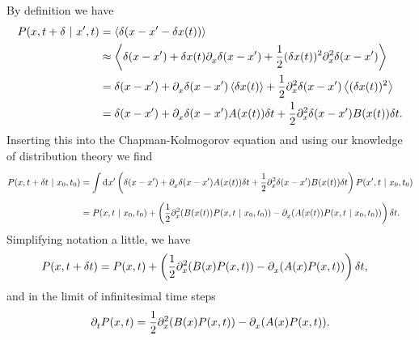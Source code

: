 By definition we have
\begin{align*}
	P(x, t + \delta \ | \  x^{\prime}, t) &= \expval{\delta(x - x\ensuremath{^{\prime}}- \delta x(t))} \\
	                              &\approx \expval{\delta(x - x\ensuremath{^{\prime}}) + \delta x(t)\partial^{}_{x}\delta(x - x\ensuremath{^{\prime}}) + \frac{1}{2}(\delta x(t))^{2}\partial^{2}_{x}\delta(x - x\ensuremath{^{\prime}})} \\
	                              &= \delta(x - x^{\prime}) + \partial^{}_{x}\delta(x - x^{\prime})\expval{\delta x(t)} + \frac{1}{2}\partial^{2}_{x}\delta(x - x^{\prime})\expval{(\delta x(t))^{2}} \\
	                              &= \delta(x - x^{\prime}) + \partial^{}_{x}\delta(x - x^{\prime})A(x(t))\delta t + \frac{1}{2}\partial^{2}_{x}\delta(x - x^{\prime})B(x(t))\delta t.
\end{align*}
Inserting this into the Chapman-Kolmogorov equation and using our knowledge of distribution theory we find
\begin{align*}
	P(x, t + \delta t \ | \  x_{0}, t_{0}) &= \int\limits_{}^{}\dd[]{x\ensuremath{^{\prime}}}\left(\delta(x - x^{\prime}) + \partial^{}_{x}\delta(x - x^{\prime})A(x(t))\delta t + \frac{1}{2}\partial^{2}_{x}\delta(x - x^{\prime})B(x(t))\delta t\right)P(x^{\prime}, t \ | \  x_{0}, t_{0}) \\
	                                      &= P(x, t \ | \  x_{0}, t_{0}) + \left(\frac{1}{2}\partial^{2}_{x}(B(x(t))P(x, t \ | \  x_{0}, t_{0})) - \partial^{}_{x}(A(x(t))P(x, t \ | \  x_{0}, t_{0}))\right)\delta t.
\end{align*}
Simplifying notation a little, we have
\begin{align*}
	P(x, t + \delta t) &= P(x, t) + \left(\frac{1}{2}\partial^{2}_{x}(B(x)P(x, t)) - \partial^{}_{x}(A(x)P(x, t))\right)\delta t,
\end{align*}
and in the limit of infinitesimal time steps
\begin{align*}
	\partial^{}_{t}P(x, t) = \frac{1}{2}\partial^{2}_{x}(B(x)P(x, t)) - \partial^{}_{x}(A(x)P(x, t)).
\end{align*}